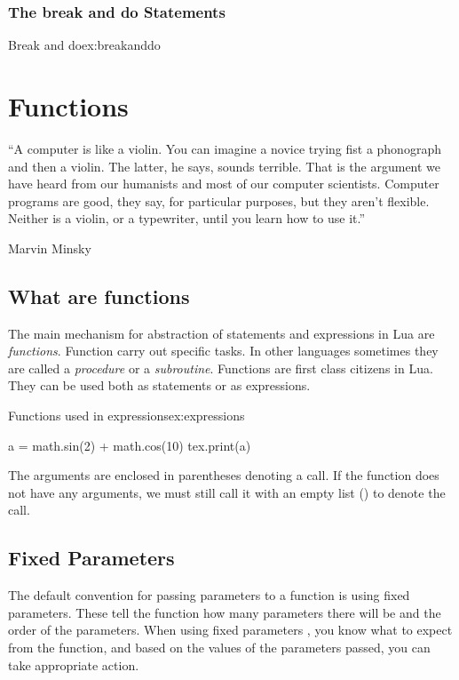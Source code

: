\subsection{The break and do Statements}
\begin{texexample}{Break and do}{ex:breakanddo}
\end{texexample}

\chapter{Functions}

\epigraph{“A computer is like a violin. You can imagine a novice trying fist a phonograph and then a violin. The latter, he says, sounds terrible. That is the argument we have heard from our humanists and most of our computer scientists. Computer programs are good, they say, for particular purposes, but they aren't flexible. Neither is a violin, or a typewriter, until you learn how to use it.” }{Marvin Minsky}

\section{What are functions}

The main mechanism for abstraction of statements and expressions in Lua are \textit{functions}. Function carry out specific tasks. In other languages sometimes they are called a \textit{procedure} or a \textit{subroutine}. Functions are first class citizens in Lua. They can be used both as statements or as expressions.

\begin{texexample}{Functions used in expressions}{ex:expressions}
\begin{luacode}
  a = math.sin(2) + math.cos(10)
  tex.print(a)
\end{luacode}
\end{texexample}

The arguments are enclosed in parentheses denoting a call. If the function does not have any arguments, we must still call it with an empty list () to denote the call.

\section{Fixed Parameters}

The default convention for passing parameters to a function is using fixed parameters. These tell
the function how many parameters there will be and the order of the parameters. When using fixed
parameters , you know what to expect from the function, and based on the values of the parameters
passed, you can take appropriate action.

